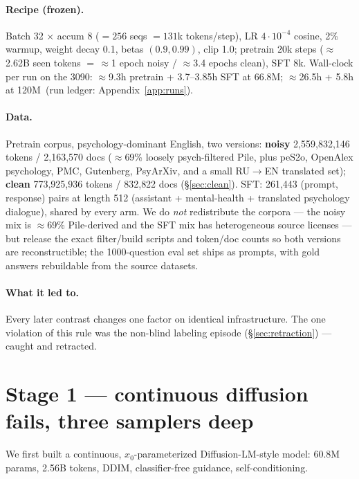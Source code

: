 \documentclass[11pt]{article}
\newcommand{\sixsix}{66.8M}
\newcommand{\onetwenty}{120M}
\begin{document}
\paragraph{Recipe (frozen).} Batch 32 $\times$ accum 8 ($=256$ seqs $=131$k tokens/step), LR $4{\cdot}10^{-4}$ cosine, 2\% warmup, weight decay 0.1, betas $(0.9,0.99)$, clip 1.0; pretrain 20k steps ($\approx$2.62B seen tokens $=\,\approx$1 epoch noisy / $\approx$3.4 epochs clean), SFT 8k. Wall-clock per run on the 3090: $\approx$9.3h pretrain + 3.7--3.85h SFT at \sixsix; $\approx$26.5h + 5.8h at \onetwenty\ (run ledger: Appendix~\ref{app:runs}).

\paragraph{Data.} Pretrain corpus, psychology-dominant English, two versions: \textbf{noisy} 2{,}559{,}832{,}146 tokens / 2{,}163{,}570 docs ($\approx$69\% loosely psych-filtered Pile, plus peS2o, OpenAlex psychology, PMC, Gutenberg, PsyArXiv, and a small RU$\to$EN translated set); \textbf{clean} 773{,}925{,}936 tokens / 832{,}822 docs (\S\ref{sec:clean}). SFT: 261{,}443 (prompt,\,response) pairs at length 512 (assistant + mental-health + translated psychology dialogue), shared by every arm. We do \emph{not} redistribute the corpora --- the noisy mix is $\approx$69\% Pile-derived and the SFT mix has heterogeneous source licenses --- but release the exact filter/build scripts and token/doc counts so both versions are reconstructible; the 1000-question eval set ships as prompts, with gold answers rebuildable from the source datasets.

\paragraph{What it led to.} Every later contrast changes one factor on identical infrastructure. The one violation of this rule was the non-blind labeling episode (\S\ref{sec:retraction}) --- caught and retracted.

\section{Stage 1 --- continuous diffusion fails, three samplers deep}\label{sec:cont}

We first built a continuous, $x_0$-parameterized Diffusion-LM-style model: 60.8M params, 2.56B tokens, DDIM, classifier-free guidance, self-conditioning.
\end{document}
